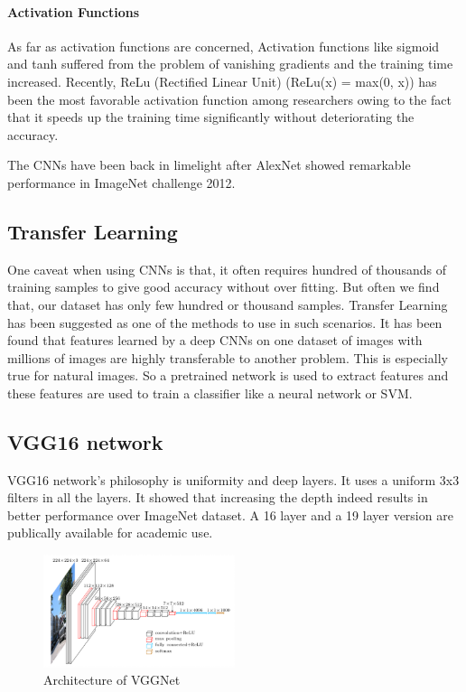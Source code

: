 \documentclass[conference]{IEEEtran}
\begin{document}
\paragraph{Activation Functions\\}

As far as activation functions are concerned, Activation functions like sigmoid and tanh suffered from the problem of vanishing gradients and the training time increased. Recently, ReLu (Rectified Linear Unit) (ReLu(x) = max(0, x)) has been the most favorable activation function among researchers owing to the fact that it speeds up the training time significantly without deteriorating the accuracy. 

The CNNs have been back in limelight after AlexNet\cite{b1} showed remarkable performance in ImageNet challenge 2012. 

\subsection{Transfer Learning}
One caveat when using CNNs is that, it often requires hundred of thousands of training samples to give good accuracy without over fitting. But often we find that, our dataset has only few hundred or thousand samples. Transfer Learning has been suggested as one of the methods to use in such scenarios. It has been found that features learned by a deep CNNs on one dataset of images with millions of images are highly transferable to another problem. This is especially true for natural images. So a pretrained network is used to extract features and these features are used to train a classifier like a neural network or SVM.


\subsection{VGG16 network}
VGG16 network’s philosophy is uniformity and deep layers. It uses a uniform 3x3 filters in all the layers. It showed that increasing the depth indeed results in better performance over ImageNet dataset. A 16 layer and a 19 layer version are publically available for academic use.

\begin{figure}[htbp]
\centerline{\includegraphics[width=0.5\textwidth]{pics/image_theory/vggnet.png}}
\caption{ Architecture of VGGNet }
\label{fig:vggnet}
\end{figure}%
\end{document}
